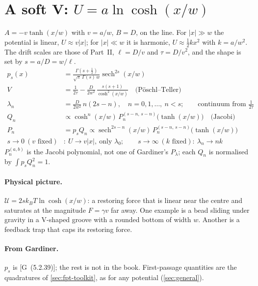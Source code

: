 \documentclass[11pt]{article}
\numberwithin{equation}{section}
\newcommand{\G}[1]{[G~(#1)]}
\begin{document}
\section{A soft V: \texorpdfstring{$U=a\ln\cosh(x/w)$}{U = a ln cosh(x/w)}}
\label{sec:lncosh}

\begin{keyresults}
$A=-v\tanh(x/w)$ with $v=a/w$, $B=D$, on the line. For $|x|\gg w$ the potential is linear, $U\approx v|x|$; for
$|x|\ll w$ it is harmonic, $U\approx\tfrac12kx^2$ with $k=a/w^2$. The drift scales are those of Part~II,
$\ell=D/v$ and $\tau=D/v^2$, and the shape is set by $s=a/D=w/\ell$.
\begin{align}
  p_s(x) &= \frac{\Gamma(s+\frac12)}{\sqrt\pi\,\Gamma(s)\,w}\operatorname{sech}^{2s}(x/w) \\
  V &= \frac1{2\tau}-\frac{D}{2w^2}\,\frac{s(s+1)}{\cosh^2(x/w)}\quad\text{(P\"oschl--Teller)} \\
  \lambda_n &= \frac{D}{2w^2}\,n(2s-n),\quad n=0,1,\dots,\ n<s;\qquad\text{continuum from }\frac1{2\tau} \\
  Q_n &\propto \cosh^n(x/w)\,P_n^{(s-n,\,s-n)}\bigl(\tanh(x/w)\bigr)\quad\text{(Jacobi)} \\
  P_n &= p_sQ_n\propto\operatorname{sech}^{2s-n}(x/w)\,P_n^{(s-n,\,s-n)}\bigl(\tanh(x/w)\bigr) \\
  s\to0\ (v\text{ fixed})&:\ U\to v|x|,\ \text{only }\lambda_0;\qquad s\to\infty\ (k\text{ fixed}):\ \lambda_n\to nk
\end{align}
$P_n^{(a,b)}$ is the Jacobi polynomial, not one of Gardiner's $P_\lambda$; each $Q_n$ is normalised by $\int p_sQ_n^2=1$.
\end{keyresults}

\paragraph{Physical picture.} $\mathcal U=2sk_BT\ln\cosh(x/w)$: a restoring force that is linear near the centre
and saturates at the magnitude $F=\gamma v$ far away. One example is a bead sliding under gravity in a V-shaped
groove with a rounded bottom of width $w$. Another is a feedback trap that caps its restoring force.

\paragraph{From Gardiner.} $p_s$ is \G{5.2.39}; the rest is not in the book. First-passage quantities are the
quadratures of \cref{sec:fpt-toolkit}, as for any potential (\cref{sec:general}).
\end{document}

